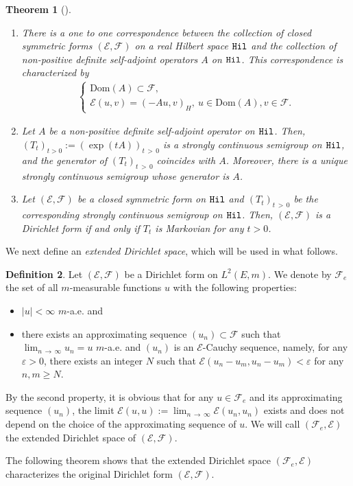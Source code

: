 \documentclass[10pt]{amsart}
\newtheorem{theo}{Theorem}[section]
\theoremstyle{definition}\newtheorem{defi}[theo]{Definition}\newtheorem{rema}[theo]{Remark}\newtheorem{exam}[theo]{Example}\newtheorem{exem}[theo]{Example}\newtheorem{nota}[theo]{Notation}
\newcommand{\ce}{\mathcal{E}}
\newcommand{\cf}{\mathcal{F}}
\newcommand{\Dom}{\mathrm{Dom}}
\begin{document}
\begin{theo}[{\cite[Theorem~1.3.1, Lemma~1.3.2, Theorem~1.4.1]{FOT}}]\leavevmode
\begin{enumerate}
\item\label{theo3.2.1} There is a one to one correspondence between the collection of closed symmetric forms $(\ce,\cf)$ on a real Hilbert space ${\tt Hil}$ and the collection of non-positive definite self-adjoint operators $A$ on ${\tt Hil}$. This correspondence is characterized by
\begin{align}\label{generator}
\begin{cases}
\Dom(A)\subset\cf,\\
\ce(u,v)=(-Au,v)_{H},\ u\in\Dom(A),v\in\cf.
\end{cases}
\end{align}
\item\label{theo3.2.2} Let $A$ be a non-positive definite self-adjoint operator on ${\tt Hil}$. Then, $(T_t)_{t>0}:=(\exp(tA))_{t\,>\,0}$ is a strongly continuous semigroup on ${\tt Hil}$, and the generator of $(T_t)_{t\,>\,0}$ coincides with $A$. Moreover, there is a unique strongly continuous semigroup whose generator is $A$.
\item\label{theo3.2.3} Let $(\ce,\cf)$ be a closed symmetric form on ${\tt Hil}$ and $(T_t)_{t\,>\,0}$ be the corresponding strongly continuous semigroup on ${\tt Hil}$. Then, $(\ce,\cf)$ is a Dirichlet form if and only if $T_t$ is Markovian for any $t>0$.
\end{enumerate}
\end{theo}

We next define an \emph{extended Dirichlet space}, which will be used in what follows.
\begin{defi}\label{def:ext-dirichlet}
Let $(\ce,\cf)$ be a Dirichlet form on $L^2(E,m)$. We denote by $\cf_e$ the set of all $m$-measurable functions $u$ with the following properties:
\begin{itemize}
\item$|u|<\infty$ $m$-a.e. and
\item there exists an approximating sequence $(u_n)\subset\cf$ such that $\lim_{n\,\to\,\infty}u_n=u$ $m$-a.e. and $(u_n)$ is an $\ce$-Cauchy sequence, namely, for any $\varepsilon>0$, there exists an integer $N$ such that $\ce(u_n-u_m,u_n-u_m)<\varepsilon$ for any $n,m\geq N$.
\end{itemize}
By the second property, it is obvious that for any $u\in\cf_e$ and its approximating sequence $(u_n)$, the limit $\ce(u,u):=\lim_{n\,\to\,\infty}\ce(u_n,u_n)$ exists and does not depend on the choice of the approximating sequence of $u$. We will call $(\cf_e,\ce)$ the extended Dirichlet space of $(\ce,\cf)$.
\end{defi}
The following theorem shows that the extended Dirichlet space $(\cf_e,\ce)$ characterizes the original Dirichlet form $(\ce,\cf)$.
\end{document}
